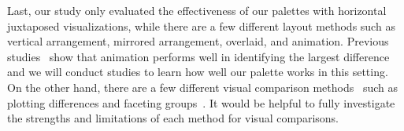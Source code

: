 Last, our study only evaluated the effectiveness of our palettes with horizontal juxtaposed visualizations, while there are a few different layout methods such as vertical arrangement, mirrored arrangement, overlaid, and animation. Previous studies~\cite{Ondov19} show that animation performs well in identifying the largest difference and we will conduct studies to learn how well our palette works in this setting. On the other hand, there are a few 
different visual comparison methods~\cite{Gleicher11} such as plotting differences and faceting groups~\cite{wickham2009elegant}. It would be helpful to fully investigate the strengths and limitations of each method for visual comparisons.


